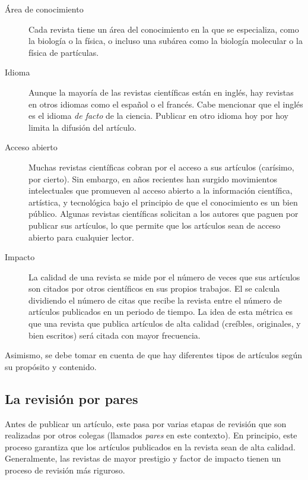 \begin{description}
    \item[Área de conocimiento] Cada revista tiene un área del conocimiento en
        la que se especializa, como la biología o la física, o incluso una
        subárea como la biología molecular o la física de partículas.
    \item[Idioma] Aunque la mayoría de las revistas científicas están en inglés,
        hay revistas en otros idiomas como el español o el francés.
        Cabe mencionar que el inglés es el idioma \emph{de facto} de la
        ciencia.
        Publicar en otro idioma hoy por hoy limita la difusión del artículo.
    \item[Acceso abierto] Muchas revistas científicas cobran por el acceso a sus
        artículos (carísimo, por cierto).
        Sin embargo, en años recientes han surgido movimientos intelectuales
        que promueven al acceso abierto a la información científica, artística,
        y tecnológica bajo el principio de que el conocimiento es un bien
        público.
        Algunas revistas científicas solicitan a los autores que paguen por
        publicar sus artículos, lo que permite que los artículos sean de acceso
        abierto para cualquier lector.
    \item[Impacto] La calidad de una revista se mide por el número de veces que
        sus artículos son citados por otros científicos en sus propios trabajos.
        El  se calcula dividiendo el número de
        citas que recibe la revista entre el número de artículos publicados en
        un periodo de tiempo.
        La idea de esta métrica es que una revista que publica artículos de alta
        calidad (creíbles, originales, y bien escritos) será citada con mayor
        frecuencia.
\end{description}

Asimismo, se debe tomar en cuenta de que hay diferentes tipos de artículos según
su propósito y contenido.

\subsection*{La revisión por pares}
Antes de publicar un artículo, este pasa por varias etapas de revisión que son
realizadas por otros colegas (llamados \emph{pares} en este contexto).
En principio, este proceso garantiza que los artículos publicados en la
revista sean de alta calidad.
Generalmente, las revistas de mayor prestigio y factor de impacto tienen un
proceso de revisión más riguroso.

